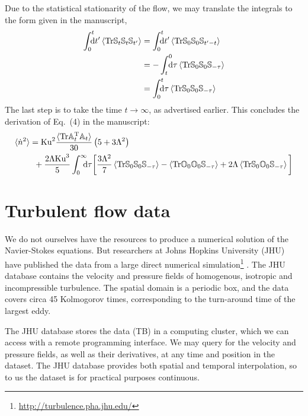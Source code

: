 \documentclass[thesis.tex]{subfiles}
\begin{document}
Due to the statistical stationarity of the flow, we may translate the integrals to the form given in the manuscript, 
\begin{align*}
	\int_0^{t}\!\!\!\!{\rm d}t'\left\langle\tr \ma S_t\ma S_{t}\ma S_{t'}\right\rangle 
	&= \int_0^{t}\!\!\!\!{\rm d}t'\left\langle\tr \ma S_0\ma S_{0}\ma S_{t'-t}\right\rangle \\
	&= -\int_t^{0}\!\!\!\!{\rm d}\tau\left\langle\tr \ma S_0\ma S_{0}\ma S_{-\tau}\right\rangle \\
	&= \int_0^{t}\!\!\!\!{\rm d}\tau\left\langle\tr \ma S_0\ma S_{0}\ma S_{-\tau}\right\rangle
\end{align*}
The last step is to take the time $t\to\infty$, as advertised earlier. This concludes the derivation of Eq.~(4) in the manuscript:
\begin{align}
\langle \dot n^2\rangle &=\ku^2\frac{\langle\tr\ma A_t\transpose \ma A_t\rangle}{30}\left(5 + 3 \Lambda^2\right) \nn \\
	&\,\,\,+ \frac{2 \Lambda\ku^3}{5} \int_0^{\infty}\!\!\!\!{\rm d}\tau \bigg[\frac{3 \Lambda^2}{7}\left\langle\tr \ma S_0\ma S_{0}\ma S_{-\tau}\right\rangle - \left\langle\tr \ma O_0\ma O_{0}\ma S_{-\tau}\right\rangle + 2 \Lambda\left\langle\tr \ma S_0\ma O_{0}\ma S_{-\tau}\right\rangle\bigg]\eqnlab{eq4final}
\end{align}


\section{Turbulent flow data}

We do not ourselves have the resources to produce a numerical solution of the Navier-Stokes equations. But researchers at Johns Hopkins University (JHU) have published the data from a large direct numerical simulation\footnote{\url{http://turbulence.pha.jhu.edu/}} \cite{li2008}. The JHU database contains the velocity and pressure fields of homogenous, isotropic and incompressible turbulence. The spatial domain is a periodic box, and the data covers circa 45 Kolmogorov times, corresponding to the turn-around time of the largest eddy. 

The JHU database stores the data (\unit[27]{TB}) in a computing cluster, which we can access with a remote programming interface. We may query for the velocity and pressure fields, as well as their derivatives, at any time and position in the dataset. The JHU database provides both spatial and temporal interpolation, so to us the dataset is for practical purposes continuous.
\end{document}

